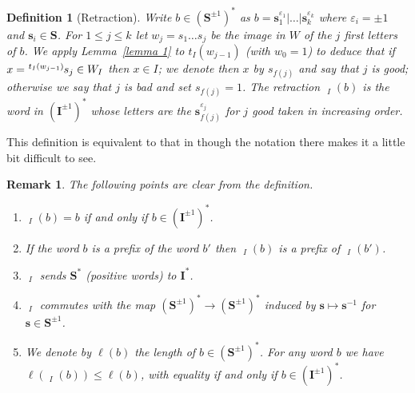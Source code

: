 \documentclass{amsart}
\numberwithin{equation}{section}
\newtheorem{definition}[equation]{Definition}
\newtheorem{remark}[equation]{Remark}
\newcommand\ve{\varepsilon}
\newcommand\lexp[2]{\kern\scriptspace\vphantom{#2}^{#1}\kern-\scriptspace#2}
\newcommand\hl{{\ell}}
\newcommand\inv{^{-1}}
\newcommand\bs{{\mathbf s}}
\newcommand\bI{{\mathbf I}}
\newcommand\bS{{\mathbf S}}
\DeclareMathOperator\hpi{\hat\pi}
\begin{document}
 
\begin{definition}[Retraction]\label{retract}
Write $b\in(\bS^{\pm1})^*$ as $b=\bs_1^{\ve_1}|\ldots|\bs_k^{\ve_k}$ where 
$\ve_i=\pm 1$ and $\bs_i\in\bS$.
For $1\le j\le k$ let $w_j=s_1\ldots s_j$ be the image in $W$ of the $j$ first
letters of $b$.
We apply Lemma~\ref{lemma 1} to $t_I(w_{j-1})$ (with $w_0=1$) to deduce that if
$x=\lexp{t_I(w_{j-1})}s_j\in W_I$ then $x\in I$; we denote then $x$
by $s_{f(j)}$ and say that $j$ is good; otherwise we say that $j$ is bad
and set $s_{f(j)}=1$.
The retraction $\hpi_I(b)$ is the word in $(\bI^{\pm1})^*$ whose letters
are the $\bs_{f(j)}^{\ve_j}$ for $j$ good taken in increasing order.
\end{definition}
This definition is equivalent to that in \cite[Page 1522]{blufstein-paris}
though the notation there makes it a little bit difficult to see.
\begin{remark}\label{obvious}
The following points are clear from the definition.
\begin{enumerate}
\item
$\hpi_I(b)=b$ if and only if $b\in(\bI^{\pm1})^*$.
\item If the
word $b$ is a prefix of the word $b'$ then $\hpi_I(b)$ is a prefix of
$\hpi_I(b')$.
\item $\hpi_I$ sends $\bS^*$ (positive words) to $\bI^*$.
\item $\hpi_I$ commutes with the map $(\bS^{\pm1})^*\to(\bS^{\pm1})^*$
 induced by $\bs\mapsto\bs\inv$ for $\bs\in\bS^{\pm1}$.
\item We denote by \index{l@$\hl$} $\hl(b)$ the length of
$b\in(\bS^{\pm1})^*$.
For any word $b$ we have $\hl(\hpi_I(b))\le \hl(b)$, with equality
if and only if $b\in (\bI^{\pm1})^*$.
\end{enumerate}
\end{remark}
\end{document}
